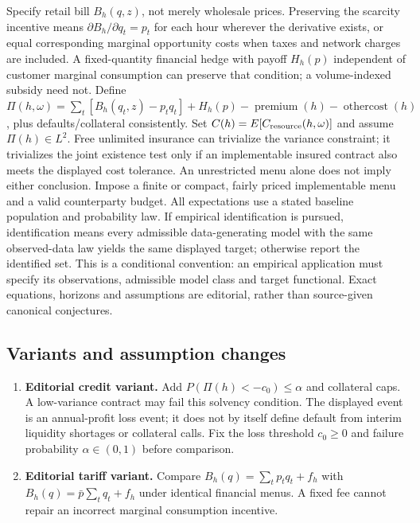 \documentclass[11pt,a4paper]{article}
\begin{document}
Specify retail bill \(B_h(q,z)\), not merely wholesale prices. Preserving the scarcity incentive means \(\partial B_h/\partial q_t=p_t\) for each hour wherever the derivative exists, or equal corresponding marginal opportunity costs when taxes and network charges are included. A fixed-quantity financial hedge with payoff \(H_h(p)\) independent of customer marginal consumption can preserve that condition; a volume-indexed subsidy need not. Define \(\Pi(h,\omega)=\sum_t[B_h(q_t,z)-p_tq_t]+H_h(p)-\operatorname{premium}(h)-\operatorname{othercost}(h)\), plus defaults/collateral consistently. Set \(C(h)=E[C_{\rm resource}(h,\omega)]\) and assume \(\Pi(h)\in L^2\). Free unlimited insurance can trivialize the variance constraint; it trivializes the joint existence test only if an implementable insured contract also meets the displayed cost tolerance. An unrestricted menu alone does not imply either conclusion. Impose a finite or compact, fairly priced implementable menu and a valid counterparty budget. All expectations use a stated baseline population and probability law. If empirical identification is pursued, identification means every admissible data-generating model with the same observed-data law yields the same displayed target; otherwise report the identified set. This is a conditional convention: an empirical application must specify its observations, admissible model class and target functional. Exact equations, horizons and assumptions are editorial, rather than source-given canonical conjectures.
\subsection*{Variants and assumption changes}
\begin{enumerate}
\item \textbf{Editorial credit variant.} Add \(P(\Pi(h)<-c_0)\leq\alpha\) and collateral caps. A low-variance contract may fail this solvency condition. The displayed event is an annual-profit loss event; it does not by itself define default from interim liquidity shortages or collateral calls. Fix the loss threshold \(c_0\geq0\) and failure probability \(\alpha\in(0,1)\) before comparison.
\item \textbf{Editorial tariff variant.} Compare \(B_h(q)=\sum_tp_tq_t+f_h\) with \(B_h(q)=\bar p\sum_tq_t+f_h\) under identical financial menus. A fixed fee cannot repair an incorrect marginal consumption incentive.
\end{enumerate}
\end{document}
